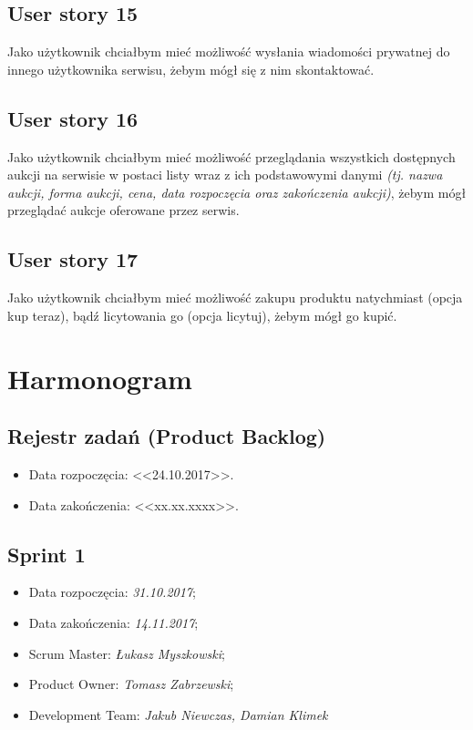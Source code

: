 \documentclass[a4paper]{article}
\begin{document}
	\subsection{User story 15}
	Jako użytkownik chciałbym mieć możliwość wysłania wiadomości prywatnej do innego użytkownika serwisu, żebym mógł się z nim skontaktować. 
	
	\subsection{User story 16}
	Jako użytkownik chciałbym mieć możliwość przeglądania wszystkich dostępnych aukcji na serwisie w postaci listy wraz z ich podstawowymi danymi \emph{(tj. nazwa aukcji, forma aukcji, cena, data rozpoczęcia oraz zakończenia aukcji)}, żebym mógł przeglądać aukcje oferowane przez serwis.
	
	\subsection{User story 17}
	Jako użytkownik chciałbym mieć możliwość zakupu produktu natychmiast (opcja kup teraz), bądź licytowania go (opcja licytuj), żebym mógł go kupić.
		
	\section{Harmonogram}
	
	\subsection{Rejestr zadań (Product Backlog)}
	
		\begin{itemize}
		\item Data rozpoczęcia: <<24.10.2017>>.
		\item  Data zakończenia: <<xx.xx.xxxx>>.
	\end{itemize}
	
	\subsection{Sprint 1}
	
	\begin{itemize}
		\item Data rozpoczęcia: \emph{31.10.2017};
		\item Data zakończenia: \emph{14.11.2017};
		\item Scrum Master: \emph{Łukasz Myszkowski};
		\item Product Owner: \emph{Tomasz Zabrzewski};
		\item Development Team: \emph{Jakub Niewczas, Damian Klimek}
	\end{itemize}
	
\end{document}
